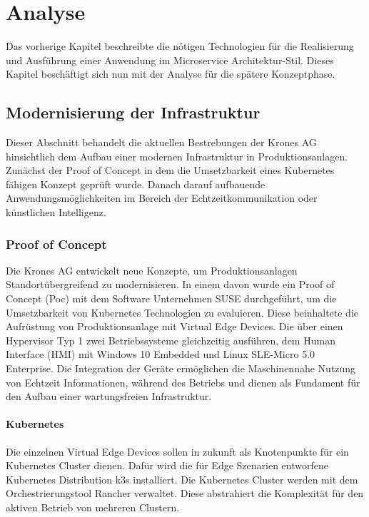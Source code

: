 \chapter{Analyse}

Das vorherige Kapitel beschreibte die nötigen Technologien für die Realisierung und Ausführung einer Anwendung im Microservice Architektur-Stil.
Dieses Kapitel beschäftigt sich nun mit der Analyse für die spätere Konzeptphase.

\section{Modernisierung der Infrastruktur}
Dieser Abschnitt behandelt die aktuellen Bestrebungen der Krones AG hinsichtlich dem Aufbau einer modernen Infrastruktur in Produktionsanlagen. 
Zunächst der Proof of Concept in dem die Umsetzbarkeit eines Kubernetes fähigen Konzept geprüft wurde. 
Danach darauf aufbauende Anwendungsmöglichkeiten im Bereich der Echtzeitkommunikation oder künstlichen Intelligenz. 

\subsection{Proof of Concept}
Die Krones AG entwickelt neue Konzepte, um Produktionsanlagen Standortübergreifend zu modernisieren. 
In einem davon wurde ein Proof of Concept (Poc) mit dem Software Unternehmen SUSE durchgeführt, um die Umsetzbarkeit von Kubernetes Technologien zu evaluieren. 
Diese beinhaltete die Aufrüstung von Produktionsanlage mit Virtual Edge Devices. 
Die über einen Hypervisor Typ 1 zwei Betriebssysteme gleichzeitig ausführen, dem Human Interface (HMI) mit Windows 10 Embedded und Linux SLE-Micro 5.0 Enterprise. 
Die Integration der Geräte ermöglichen die Maschinennahe Nutzung von Echtzeit Informationen, während des Betriebs und dienen als Fundament für den Aufbau einer wartungsfreien Infrastruktur.

\subsubsection{Kubernetes}
Die einzelnen Virtual Edge Devices sollen in zukunft als Knotenpunkte für ein Kubernetes Cluster dienen. 
Dafür wird die für Edge Szenarien entworfene Kubernetes Distribution k3s installiert. 
Die Kubernetes Cluster werden mit dem Orchestrierungstool Rancher verwaltet. 
Diese abstrahiert die Komplexität für den aktiven Betrieb von mehreren Clustern.


